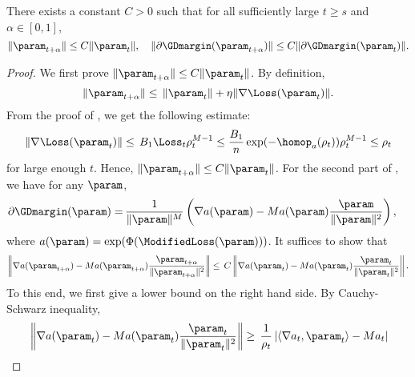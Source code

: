 \begin{lemma}\label{lem:gd_interpolation_bound}
    There exists a constant $C > 0$ such that for all sufficiently large $t \ge s$ and $\alpha \in [0, 1]$,
    \begin{equation}\label{eq:gd_interpolation_bound}
        \| \param_{t+\alpha} \| \le C \| \param_t \|, \quad \| \partial \GDmargin (\param_{t+\alpha}) \| \le C \| \partial \GDmargin (\param_t) \|.
    \end{equation}
\end{lemma}

\begin{proof}
    We first prove $\| \param_{t+\alpha} \| \le C \| \param_t \|$. By definition,
    \begin{equation*}
        \| \param_{t+\alpha} \| \le \, \| \param_t \| + \eta \| \nabla \Loss (\param_t) \|.
    \end{equation*}
    From the proof of , we get the following estimate:
    \begin{equation*}
        \| \nabla \Loss (\param_t) \| \le \, B_1 \Loss_t \rho_t^{M-1} \le \frac{B_1}{n} \exp(- \homop_a(\rho_t)) \rho_t^{M-1} \le \rho_t
    \end{equation*}
    for large enough $t$. Hence, $\| \param_{t+\alpha} \| \le C \| \param_t \|$. For the second part of , we have for any $\param$,
    \begin{align*}
        \partial \GDmargin (\param) = \, & \frac{1}{\| \param \|^M} \left( \nabla a(\param) - M a(\param) \frac{\param}{\| \param \|^2} \right),
    \end{align*} 
    where $a(\param) = \exp(\Phi(\ModifiedLoss(\param)))$. It suffices to show that
    \begin{equation*}
        \left\| \nabla a(\param_{t+\alpha}) - M a(\param_{t+\alpha}) \frac{\param_{t+\alpha}}{\| \param_{t+\alpha} \|^2} \right\| \le \, C \left\| \nabla a(\param_t) - M a(\param_t) \frac{\param_t}{\| \param_t \|^2} \right\|.
    \end{equation*}
    To this end, we first give a lower bound on the right hand side. By Cauchy-Schwarz inequality,
    \begin{equation}\label{eq:lowerbd_A_theta}
    \begin{split}
        & \left\| \nabla a(\param_t) - M a(\param_t) \frac{\param_t}{\| \param_t \|^2} \right\| \ge \, \frac{1}{\rho_t} \left\vert \langle \nabla a_t, \param_t \rangle - M a_t \right\vert \\

\end{split}
\end{equation}
\end{proof}
